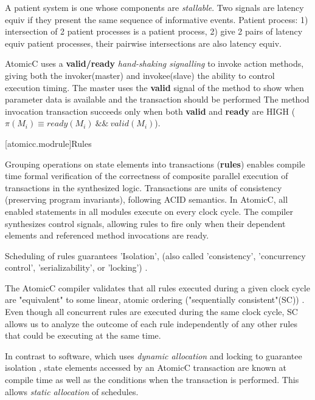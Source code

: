 A patient system is one whose components are \textit{stallable}.
Two signals are latency equiv if they present the same sequence of
informative events.
Patient process: 1) intersection of 2 patient processes is a patient
process, 2) give 2 pairs of latency equiv patient processes,
their pairwise intersections are also latency equiv.

AtomicC uses a \textbf{valid/ready} \textit{hand-shaking signalling}
\cite{Fletcher2009, AXISpec} to invoke action methods,
giving both the invoker(master) and invokee(slave) the ability to control execution timing.
The master uses the \textbf{valid} signal
of the method to show when parameter data is available and the transaction should be performed
The method invocation transaction succeeds only when
both \textbf{valid} and \textbf{ready} are HIGH ($\pi(M_{i}) \equiv ready(M_{i})\ \&\&\ valid(M_{i})$).

[atomicc.modrule]{Rules}

Grouping operations on state elements into transactions (\textbf{rules})
enables compile time formal verification of the correctness of
composite parallel execution of transactions
in the synthesized logic.
Transactions are units of consistency (preserving program invariants), following ACID semantics.
In AtomicC, all enabled statements in all modules execute on every clock cycle.
The compiler synthesizes control signals, allowing rules to fire
only when their dependent elements and referenced method invocations are ready.

Scheduling of rules guarantees 'Isolation',
(also called 'consistency', 'concurrency control', 'serializability', or 'locking')
\cite[Sec.~7.1]{GrayR93}.

The AtomicC compiler
validates that all rules executed during a given clock cycle are "equivalent"
to some linear, atomic ordering ("sequentially consistent"(SC))
\cite{Lamport:1979:MMC:1311099.1311750}.
Even though all concurrent rules are executed during the same clock cycle,
SC allows us to analyze the
outcome of each rule independently of any other rules that could be executing at the same time.

In contrast to software, which uses \textit{dynamic allocation} and locking to guarantee isolation
\cite[p.~377]{GrayR93} \cite[Sec.~11.2]{OV11},
state elements accessed by an AtomicC transaction are known at compile time as well as the
conditions when the transaction is performed.  This allows \textit{static allocation}
\cite[Sec.~7.3.1]{GrayR93} of schedules.

